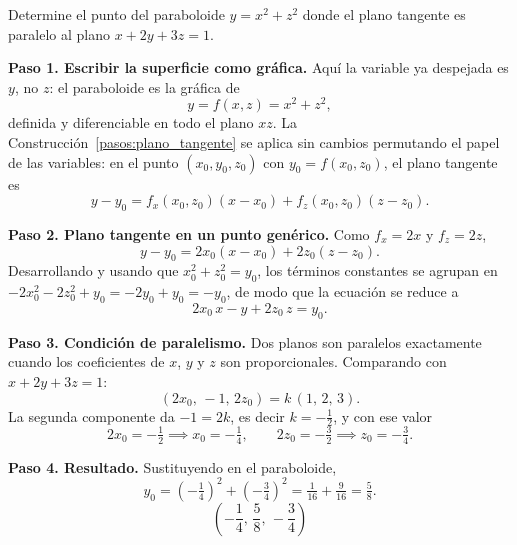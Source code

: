 \begin{prob}
Determine el punto del paraboloide $y=x^2+z^2$ donde el plano tangente es paralelo al plano $x+2y+3z=1.$
\begin{myproof}
\textbf{Paso 1. Escribir la superficie como gráfica.}
Aquí la variable ya despejada es $y$, no $z$: el paraboloide es la gráfica de
\[
y=f(x,z)=x^2+z^2,
\]
definida y diferenciable en todo el plano $xz$. La Construcción~\ref{pasos:plano_tangente} se aplica sin cambios permutando el papel de las variables: en el punto $(x_0,y_0,z_0)$ con $y_0=f(x_0,z_0)$, el plano tangente es
\[
y-y_0=f_x(x_0,z_0)(x-x_0)+f_z(x_0,z_0)(z-z_0).
\]

\textbf{Paso 2. Plano tangente en un punto genérico.}
Como $f_x=2x$ y $f_z=2z$,
\[
y-y_0=2x_0(x-x_0)+2z_0(z-z_0).
\]
Desarrollando y usando que $x_0^2+z_0^2=y_0$, los términos constantes se agrupan en
$-2x_0^2-2z_0^2+y_0=-2y_0+y_0=-y_0$, de modo que la ecuación se reduce a
\[
2x_0\,x-y+2z_0\,z=y_0.
\]

\textbf{Paso 3. Condición de paralelismo.}
Dos planos son paralelos exactamente cuando los coeficientes de $x$, $y$ y $z$ son proporcionales. Comparando con $x+2y+3z=1$:
\[
(2x_0,\,-1,\,2z_0)=k\,(1,\,2,\,3).
\]
La segunda componente da $-1=2k$, es decir $k=-\tfrac{1}{2}$, y con ese valor
\[
2x_0=-\tfrac{1}{2}\implies x_0=-\tfrac{1}{4},
\qquad
2z_0=-\tfrac{3}{2}\implies z_0=-\tfrac{3}{4}.
\]

\textbf{Paso 4. Resultado.}
Sustituyendo en el paraboloide,
\[
y_0=\left(-\tfrac{1}{4}\right)^2+\left(-\tfrac{3}{4}\right)^2=\tfrac{1}{16}+\tfrac{9}{16}=\tfrac{5}{8}.
\]
\[
\boxed{\left(-\frac{1}{4},\,\frac{5}{8},\,-\frac{3}{4}\right)}
\]
\end{myproof}
\end{prob}

